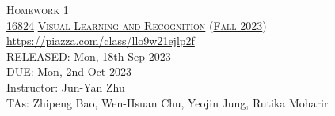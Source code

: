 \documentclass[11pt,addpoints,answers]{exam}
\title{\textsc{\hwName}} %
\author{}
\date{}
\date{}
\numberwithin{equation}{section} %
\numberwithin{figure}{section} %
\numberwithin{table}{section} %
\newcommand{\courseNum}{\href{https://visual-learning.cs.cmu.edu/}{16824}}
\newcommand{\courseName}{\href{https://visual-learning.cs.cmu.edu/}{Visual Learning and Recognition}}
\newcommand{\courseSem}{\href{https://visual-learning.cs.cmu.edu/}{Fall 2023}}
\newcommand{\courseUrl}{\url{https://piazza.com/class/llo9w21ejlp2f}}
\newcommand{\hwNum}{Homework 1}
\newcommand{\hwTopic}{Image Classification and Object Detection}
\newcommand{\outDate}{Mon, 18th Sep 2023}
\newcommand{\dueDate}{Mon, 2nd Oct 2023}
\newcommand{\instructorName}{Jun-Yan Zhu}
\newcommand{\taNames}{Zhipeng Bao, Wen-Hsuan Chu, Yeojin Jung, Rutika Moharir}
\begin{document}
\section*{}
\begin{center}
  \textsc{\LARGE \hwNum} \\
  \vspace{1em}
  \textsc{\large \courseNum{} \courseName{} (\courseSem)} \\
  \courseUrl\\
  \vspace{1em}
  RELEASED: \outDate \\
  DUE: \dueDate \\
  Instructor: \instructorName \\
  TAs: \taNames
\end{center}
\end{document}
